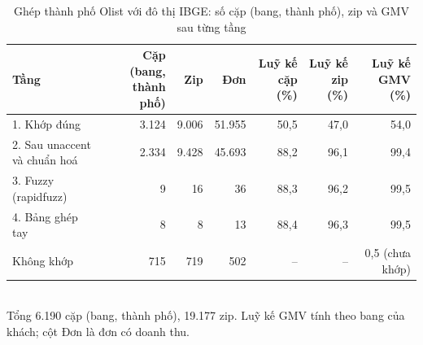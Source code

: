 \begin{table}[htbp]\centering\scriptsize\caption{Ghép thành phố Olist với đô thị IBGE: số cặp (bang, thành phố), zip và GMV sau từng tầng}\label{tab:api-match}
\begin{tabular}{lrrrrrr}\toprule
\textbf{Tầng} & \textbf{Cặp (bang, thành phố)} & \textbf{Zip} & \textbf{Đơn} & \textbf{Luỹ kế cặp (\%)} & \textbf{Luỹ kế zip (\%)} & \textbf{Luỹ kế GMV (\%)} \\\midrule
1. Khớp đúng & 3.124 & 9.006 & 51.955 & 50,5 & 47,0 & 54,0 \\
2. Sau unaccent và chuẩn hoá & 2.334 & 9.428 & 45.693 & 88,2 & 96,1 & 99,4 \\
3. Fuzzy (rapidfuzz) & 9 & 16 & 36 & 88,3 & 96,2 & 99,5 \\
4. Bảng ghép tay & 8 & 8 & 13 & 88,4 & 96,3 & 99,5 \\
Không khớp & 715 & 719 & 502 & – & – & 0,5 (chưa khớp) \\
\bottomrule\end{tabular}\\[2pt]{\footnotesize Tổng 6.190 cặp (bang, thành phố), 19.177 zip. Luỹ kế GMV tính theo bang của khách; cột Đơn là đơn có doanh thu.}
\end{table}
